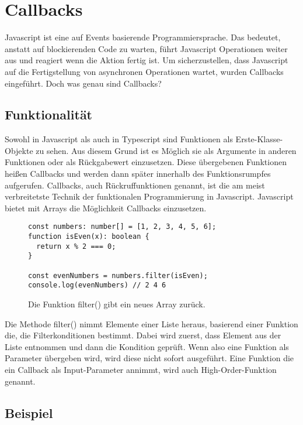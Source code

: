 \section{Callbacks}
Javascript ist eine auf Events basierende Programmiersprache. Das bedeutet, anstatt auf blockierenden Code zu warten, führt Javascript Operationen weiter aus und reagiert wenn die Aktion fertig ist. Um sicherzustellen, dass Javascript auf die Fertigstellung von asynchronen Operationen wartet, wurden Callbacks eingeführt. Doch was genau sind Callbacks?

\subsection{Funktionalität}

Sowohl in Javascript als auch in Typescript sind Funktionen als Erste-Klasse-Objekte zu sehen. Aus diesem Grund ist es Möglich sie als Argumente in anderen Funktionen oder als Rückgabewert einzusetzen. Diese übergebenen Funktionen heißen Callbacks und werden dann \glqq{}später\grqq{} innerhalb des Funktionsrumpfes aufgerufen. Callbacks, auch Rückruffunktionen genannt, ist die am meist verbreitetste Technik der funktionalen Programmierung in Javascript.\cite{callbacks-intro} Javascript bietet mit Arrays die Möglichkeit Callbacks einzusetzen.

\begin{figure}[H]
\begin{lstlisting}[basicstyle=\small]
const numbers: number[] = [1, 2, 3, 4, 5, 6];
function isEven(x): boolean { 
  return x % 2 === 0; 
}

const evenNumbers = numbers.filter(isEven);
console.log(evenNumbers) // 2 4 6
\end{lstlisting}
\caption{Die Funktion filter() gibt ein neues Array zurück.}
\end{figure}

\noindent
Die Methode filter() nimmt Elemente einer Liste heraus, basierend einer Funktion die, die Filterkonditionen bestimmt. Dabei wird zuerst, dass Element aus der Liste entnommen und dann die Kondition geprüft. Wenn also eine Funktion als Parameter übergeben wird, wird diese nicht sofort ausgeführt. Eine Funktion die ein Callback als Input-Parameter annimmt, wird auch High-Order-Funktion genannt.\cite{callbacks-example}

\subsection{Beispiel}

